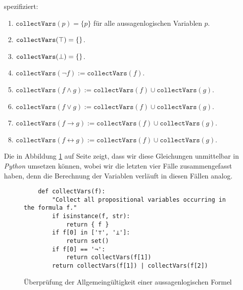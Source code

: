 spezifiziert:
\begin{enumerate}
\item $\mathtt{collectVars}(p) = \{ p \}$ \quad für alle aussagenlogischen Variablen $p$.
\item $\mathtt{collectVars}(\top) = \{\}$.
\item $\mathtt{collectVars}(\bot) = \{\}$.
\item $\mathtt{collectVars}(\neg f) := \mathtt{collectVars}(f)$.
\item $\mathtt{collectVars}(f \wedge g) := \mathtt{collectVars}(f) \cup \mathtt{collectVars}(g)$.
\item $\mathtt{collectVars}(f \vee g) := \mathtt{collectVars}(f) \cup \mathtt{collectVars}(g)$.
\item $\mathtt{collectVars}(f \rightarrow g) := \mathtt{collectVars}(f) \cup \mathtt{collectVars}(g)$.
\item $\mathtt{collectVars}(f \leftrightarrow g) := \mathtt{collectVars}(f) \cup \mathtt{collectVars}(g)$.
\end{enumerate}
Die in Abbildung \ref{fig:tautology.py-collectVars} auf Seite \pageref{fig:tautology.py-collectVars} zeigt,
dass wir diese Gleichungen unmittelbar in \textsl{Python} umsetzen können, wobei wir die letzten vier Fälle
zusammengefasst haben, denn die Berechnung der Variablen verläuft in diesen Fällen analog.

\begin{figure}[!ht]
  \centering
\begin{verbatim}
    def collectVars(f):
        "Collect all propositional variables occurring in the formula f."
        if isinstance(f, str):
            return { f }
        if f[0] in ['⊤', '⊥']:
            return set()
        if f[0] == '¬':
            return collectVars(f[1])
        return collectVars(f[1]) | collectVars(f[2]) 
\end{verbatim}
\vspace*{-0.3cm}
  \caption{Überprüfung der Allgemeingültigkeit einer aussagenlogischen Formel}
  \label{fig:tautology.py-collectVars}
\end{figure}

